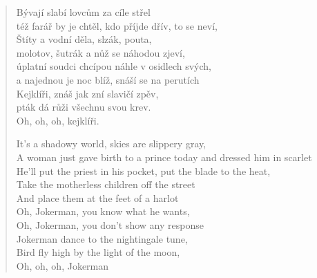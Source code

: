 \begin{verse}
Bývají slabí lovcům za cíle střel\\
též farář by je chtěl, kdo příjde dřív, to se neví, \\
Štíty a vodní děla, slzák, pouta, \\
molotov, šutrák a nůž se náhodou zjeví, \\
úplatní soudci chcípou náhle v osidlech svých, \\
a najednou je noc blíž, snáší se na perutích \\
Kejklíři, znáš jak zní slavičí zpěv,\\
pták dá růži všechnu svou krev. \\
Oh, oh, oh, kejklíři.

It's a shadowy world, skies are slippery gray, \\
A woman just gave birth to a prince today and dressed him in scarlet \\
He'll put the priest in his pocket, put the blade to the heat, \\
Take the motherless children off the street \\
And place them at the feet of a harlot \\
Oh, Jokerman, you know what he wants, \\
Oh, Jokerman, you don't show any response \\
Jokerman dance to the nightingale tune, \\
Bird fly high by the light of the moon, \\
Oh, oh, oh, Jokerman
\end{verse}
